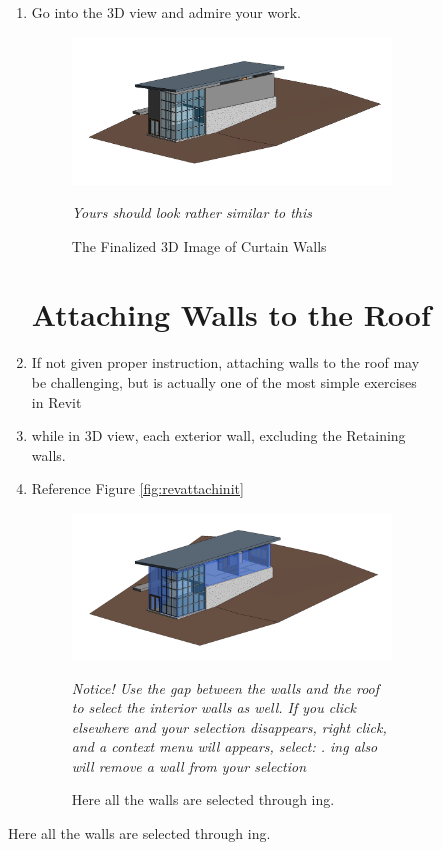 \documentclass{tufte-book} %
\begin{document}
\begin{figure}
\begin{enumerate}
		\item Go into the 3D view and admire your work.
		
		\begin{figure}	
			\includegraphics[width=\linewidth]{revitcurtainwall3dviewfinal.png}
			\caption{The Finalized 3D Image of Curtain Walls}
			\emph{Yours should look rather similar to this}
			\label{fig:revcurtthreedfinal}
		\end{figure}
		

\section{Attaching Walls to the Roof}
	\item If not given proper instruction, attaching walls to the roof may be challenging, but is actually one of the most simple exercises in Revit
	\item while in 3D view,  each exterior wall, excluding the Retaining walls.
	\item Reference Figure \ref{fig:revattachinit}
	
	\begin{figure}
		\includegraphics[width=\linewidth]{revitattachmentwallsinitial.png}
		\caption[All walls selected for attachment process]{Here all the walls are selected through ing.}
		\emph{Notice! Use the gap between the walls and the roof to select the interior walls as well. If you click elsewhere and your selection disappears, right click, and a context menu will appears, select: . ing also will remove a wall from your selection}	
	\end{figure}
	

\end{enumerate}
\end{figure}
\end{document}
